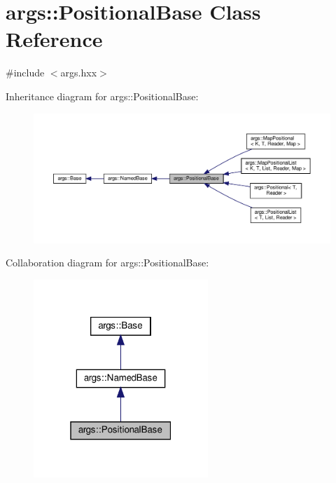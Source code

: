 \hypertarget{classargs_1_1_positional_base}{}\section{args\+:\+:Positional\+Base Class Reference}
\label{classargs_1_1_positional_base}


{\ttfamily \#include $<$args.\+hxx$>$}



Inheritance diagram for args\+:\+:Positional\+Base\+:\nopagebreak
\begin{figure}[H]
\begin{center}
\leavevmode
\includegraphics[width=350pt]{classargs_1_1_positional_base__inherit__graph}
\end{center}
\end{figure}


Collaboration diagram for args\+:\+:Positional\+Base\+:\nopagebreak
\begin{figure}[H]
\begin{center}
\leavevmode
\includegraphics[width=187pt]{classargs_1_1_positional_base__coll__graph}
\end{center}
\end{figure}
